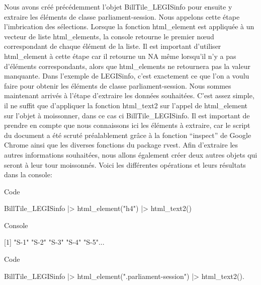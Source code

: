 \documentclass[
  letterpaper,
  DIV=11,
  numbers=noendperiod]{scrreprt}
\newenvironment{Shaded}{\begin{snugshade}}{\end{snugshade}}
\newcommand{\BuiltInTok}[1]{\textcolor[rgb]{0.00,0.23,0.31}{#1}}
\newcommand{\ExtensionTok}[1]{\textcolor[rgb]{0.00,0.23,0.31}{#1}}
\newcommand{\KeywordTok}[1]{\textcolor[rgb]{0.00,0.23,0.31}{#1}}
\newcommand{\NormalTok}[1]{\textcolor[rgb]{0.00,0.23,0.31}{#1}}
\newcommand{\OperatorTok}[1]{\textcolor[rgb]{0.37,0.37,0.37}{#1}}
\newcommand{\StringTok}[1]{\textcolor[rgb]{0.13,0.47,0.30}{#1}}
\begin{document}
Nous avons créé précédemment l'objet BillTile\_LEGISinfo pour ensuite y
extraire les éléments de classe parliament-session. Nous appelons cette
étape l'imbrication des sélections. Lorsque la fonction html\_element
est appliquée à un vecteur de liste html\_elements, la console retourne
le premier nœud correspondant de chaque élément de la liste. Il est
important d'utiliser html\_element à cette étape car il retourne un NA
même lorsqu'il n'y a pas d'éléments correspondants, alors que
html\_elements ne retournera pas la valeur manquante. Dans l'exemple de
LEGISinfo, c'est exactement ce que l'on a voulu faire pour obtenir les
éléments de classe parliament-session. Nous sommes maintenant arrivés à
l'étape d'extraire les données souhaitées. C'est assez simple, il ne
suffit que d'appliquer la fonction html\_text2 sur l'appel de
html\_element sur l'objet à moissonner, dans ce cas ci
BillTile\_LEGISinfo. Il est important de prendre en compte que nous
connaissons ici les éléments à extraire, car le script du document a été
scruté préalablement grâce à la fonction ``inspect'' de Google Chrome
ainsi que les diverses fonctions du package rvest. Afin d'extraire les
autres informations souhaitées, nous allons également créer deux autres
objets qui seront à leur tour moissonnés. Voici les différentes
opérations et leurs résultats dans la console:

Code

\begin{Shaded}
\begin{Highlighting}[]
\ExtensionTok{BillTile\_LEGISinfo} \KeywordTok{|}\OperatorTok{\textgreater{}}\NormalTok{ html\_element}\KeywordTok{(}\StringTok{"h4"}\KeywordTok{)} \KeywordTok{|}\OperatorTok{\textgreater{}}\NormalTok{ html\_text2}\KeywordTok{()}
\end{Highlighting}
\end{Shaded}

Console

\begin{Shaded}
\begin{Highlighting}[]
\ExtensionTok{[1]} \StringTok{"S{-}1"}   \StringTok{"S{-}2"}   \StringTok{"S{-}3"}   \StringTok{"S{-}4"}   \StringTok{"S{-}5"}\NormalTok{...}
\end{Highlighting}
\end{Shaded}

Code

\begin{Shaded}
\begin{Highlighting}[]
\ExtensionTok{BillTile\_LEGISinfo} \KeywordTok{|}\OperatorTok{\textgreater{}}\NormalTok{ html\_element}\KeywordTok{(}\StringTok{".parliament{-}session"}\KeywordTok{)} \KeywordTok{|}\OperatorTok{\textgreater{}}\NormalTok{ html\_text2}\KeywordTok{()}\BuiltInTok{.}
\end{Highlighting}
\end{Shaded}
\end{document}
